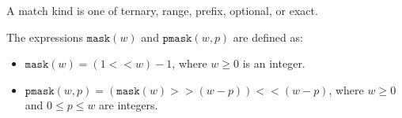 \documentclass[acmsmall]{acmart}
\newcommand*\BitAnd{\mathbin{\&}}
\newcommand*\ShiftLeft{<<}
\newcommand*\ShiftRight{>>}
\newcommand*\BitNeg{\ensuremath{\mathord{\sim}}}
\newcommand{\fullmask}[1]{}
\renewcommand{\fullmask}[1]{\ensuremath{\mathtt{mask}({#1})}}
\newcommand{\prefixmask}[2]{}
\renewcommand{\prefixmask}[2]{\ensuremath{\mathtt{pmask}({#1},{#2})}}
\begin{document}
\begin{definition}
\label{defn:match-kind}
A match kind is one of ternary, range, prefix, optional, or exact.
\end{definition}

\begin{definition}
\label{defn:masks}
The expressions $\fullmask{w}$ and $\prefixmask{w}{p}$ are defined as:
\begin{itemize}
\item $\fullmask{w} = (1 \ShiftLeft w) - 1$, where $w \geq 0$ is an integer.
\item $\prefixmask{w}{p} = (\fullmask{w} \ShiftRight (w-p)) \ShiftLeft (w-p)$,
where $w \geq 0$ and $0 \leq p \leq w$ are integers.
\end{itemize}
\end{definition}
\end{document}
